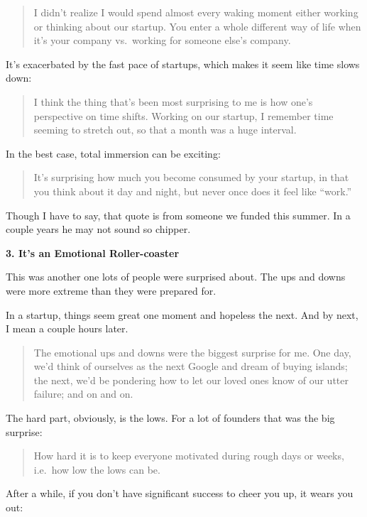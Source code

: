 \documentclass[12pt]{book}
\begin{document}
\begin{quote}
I didn't realize I would spend almost every waking moment either working
or thinking about our startup. You enter a whole different way of life
when it's your company vs.~working for someone else's company.
\end{quote}

It's exacerbated by the fast pace of startups, which makes it seem like
time slows down:

\begin{quote}
I think the thing that's been most surprising to me is how one's
perspective on time shifts. Working on our startup, I remember time
seeming to stretch out, so that a month was a huge interval.
\end{quote}

In the best case, total immersion can be exciting:

\begin{quote}
It's surprising how much you become consumed by your startup, in that
you think about it day and night, but never once does it feel like
``work.''
\end{quote}

Though I have to say, that quote is from someone we funded this summer.
In a couple years he may not sound so chipper.

\textbf{3. It's an Emotional Roller-coaster}

This was another one lots of people were surprised about. The ups and
downs were more extreme than they were prepared for.

In a startup, things seem great one moment and hopeless the next. And by
next, I mean a couple hours later.

\begin{quote}
The emotional ups and downs were the biggest surprise for me. One day,
we'd think of ourselves as the next Google and dream of buying islands;
the next, we'd be pondering how to let our loved ones know of our utter
failure; and on and on.
\end{quote}

The hard part, obviously, is the lows. For a lot of founders that was
the big surprise:

\begin{quote}
How hard it is to keep everyone motivated during rough days or weeks,
i.e.~how low the lows can be.
\end{quote}

After a while, if you don't have significant success to cheer you up, it
wears you out:
\end{document}
